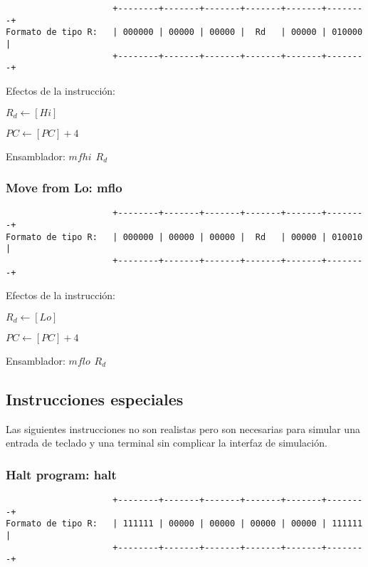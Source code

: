 \documentclass[letterpaper,11pt]{scrartcl}
\begin{document}
\begin{verbatim}
                     +--------+-------+-------+-------+-------+--------+ 
Formato de tipo R:   | 000000 | 00000 | 00000 |  Rd   | 00000 | 010000 | 
                     +--------+-------+-------+-------+-------+--------+ 
\end{verbatim}

Efectos de la instrucción: 

$R_d \leftarrow [Hi]$

$PC \leftarrow [PC] + 4$

Ensamblador: $mfhi\hspace{5pt}R_{d}$


\subsubsection*{Move from Lo: \textbf{mflo}}

\begin{verbatim}
                     +--------+-------+-------+-------+-------+--------+ 
Formato de tipo R:   | 000000 | 00000 | 00000 |  Rd   | 00000 | 010010 | 
                     +--------+-------+-------+-------+-------+--------+ 
\end{verbatim}

Efectos de la instrucción: 

$R_d \leftarrow [Lo]$

$PC \leftarrow [PC] + 4$

Ensamblador: $mflo\hspace{5pt}R_{d}$

\subsection*{Instrucciones especiales}

Las siguientes instrucciones no son realistas pero son necesarias para simular una entrada de teclado y una terminal
sin complicar la interfaz de simulación.


\subsubsection*{Halt program: \textbf{halt}}

\begin{verbatim}
                     +--------+-------+-------+-------+-------+--------+ 
Formato de tipo R:   | 111111 | 00000 | 00000 | 00000 | 00000 | 111111 | 
                     +--------+-------+-------+-------+-------+--------+ 
\end{verbatim}
\end{document}
